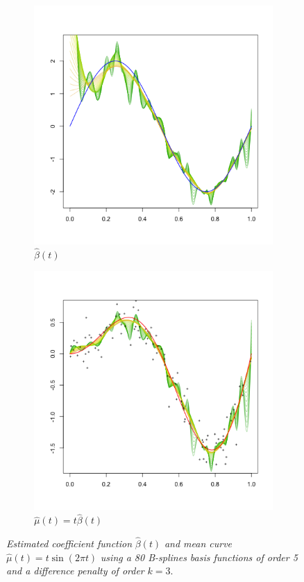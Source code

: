 \documentclass[12pt]{article}
\theoremstyle{definition}
\begin{document}
\begin{figure}[H]
 \begin{subfigure}{.48\textwidth}
  \centering
   \graphicspath{{img/}}
 \includegraphics[scale=0.5]{PS_VCM_section_figure_2.png}
 \caption{$\hat{\beta}\left(t\right)$}
 \end{subfigure}
 \begin{subfigure}{.48\textwidth}
  \centering
   \graphicspath{{img/}}
  \includegraphics[scale=0.5]{PS_VCM_section_figure_3.png}
 \caption{$\hat{\mu}\left(t\right) = t \hat{\beta}\left(t\right)$}
\label{fig:PS_VCM_section_figure_2}
 \end{subfigure}
 \caption{\textit{Estimated coefficient function} $\hat{\beta}\left(t\right)$ \textit{and mean curve} $\hat{\mu}\left(t\right) = t \sin(2 \pi t)$ \textit{using a 80 B-splines basis functions of order 5 and a difference penalty of order} $k=3$.}
\end{figure}
\end{document}
